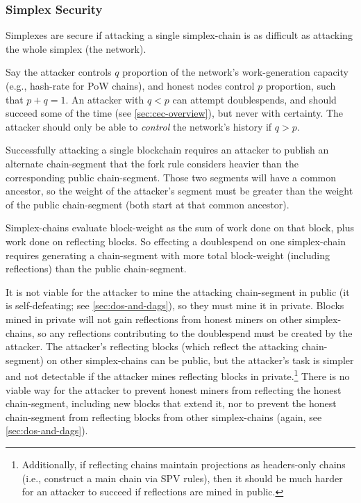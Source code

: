 

\subsubsection{Simplex Security}

\label{sec:simplex-security}

Simplexes are secure if attacking a single simplex-chain is as difficult as attacking the whole simplex (the network).

Say the attacker controls $q$ proportion of the network's work-generation capacity (e.g., hash-rate for PoW chains), and honest nodes control $p$ proportion, such that $p+q=1$.
An attacker with $q < p$ can attempt doublespends, and should succeed some of the time (see \autoref{sec:cec-overview}), but never with certainty.
The attacker should only be able to \emph{control} the network's history if $q > p$.

Successfully attacking a single blockchain requires an attacker to publish an alternate chain-segment that the fork rule considers heavier than the corresponding public chain-segment.
Those two segments will have a common ancestor, so the weight of the attacker's segment must be greater than the weight of the public chain-segment (both start at that common ancestor).

Simplex-chains evaluate block-weight as the sum of work done on that block, plus work done on reflecting blocks.
So effecting a doublespend on one simplex-chain requires generating a chain-segment with more total block-weight (including reflections) than the public chain-segment.

It is not viable for the attacker to mine the attacking chain-segment in public (it is self-defeating; see \autoref{sec:dos-and-dags}), so they must mine it in private.
Blocks mined in private will not gain reflections from honest miners on other simplex-chains, so any reflections contributing to the doublespend must be created by the attacker.
The attacker's reflecting blocks (which reflect the attacking chain-segment) on other simplex-chains can be public, but the attacker's task is simpler and not detectable if the attacker mines reflecting blocks in private.\footnote{
    Additionally, if reflecting chains maintain projections as headers-only chains (i.e., construct a main chain via SPV rules), then it should be much harder for an attacker to succeed if reflections are mined in public.
}
There is no viable way for the attacker to prevent honest miners from reflecting the honest chain-segment, including new blocks that extend it, nor to prevent the honest chain-segment from reflecting blocks from other simplex-chains (again, see \autoref{sec:dos-and-dags}).

